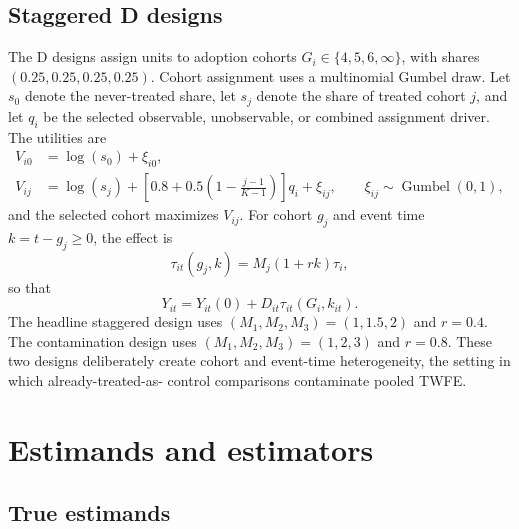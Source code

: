 \documentclass[11pt]{article}
\begin{document}
\subsection{Staggered D designs}

The D designs assign units to adoption cohorts $G_i\in\{4,5,6,\infty\}$,
with shares $(0.25,0.25,0.25,0.25)$. Cohort assignment uses a multinomial
Gumbel draw. Let $s_0$ denote the never-treated share, let $s_j$ denote the
share of treated cohort $j$, and let $q_i$ be the selected observable,
unobservable, or combined assignment driver. The utilities are
\begin{align}
 V_{i0}&=\log(s_0)+\xi_{i0},\\
 V_{ij}&=\log(s_j)+\left[0.8+0.5\left(1-\frac{j-1}{K-1}\right)\right]q_i+\xi_{ij},
 \qquad \xi_{ij}\sim\operatorname{Gumbel}(0,1),
 \label{eq:cohort-assignment}
\end{align}
and the selected cohort maximizes $V_{ij}$. For cohort $g_j$ and event time
$k=t-g_j\ge0$, the effect is
\begin{equation}
 \tau_{it}(g_j,k)=M_j(1+rk)\tau_i,
 \label{eq:staggered-effect}
\end{equation}
so that
\begin{equation}
 Y_{it}=Y_{it}(0)+D_{it}\tau_{it}(G_i,k_{it}).
 \label{eq:staggered-outcome}
\end{equation}
The headline staggered design uses
$(M_1,M_2,M_3)=(1,1.5,2)$ and $r=0.4$. The contamination design uses
$(M_1,M_2,M_3)=(1,2,3)$ and $r=0.8$. These two designs deliberately create
cohort and event-time heterogeneity, the setting in which already-treated-as-
control comparisons contaminate pooled TWFE.

\section{Estimands and estimators}

\subsection{True estimands}
\end{document}
